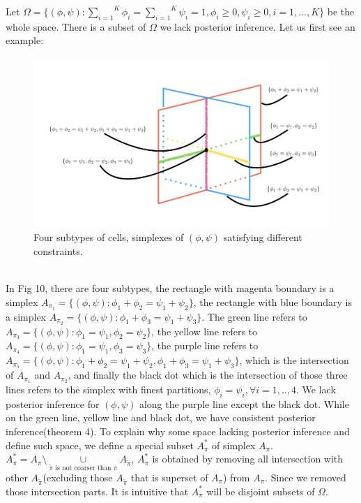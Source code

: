 \documentclass[aoas,preprint]{imsart}
\begin{document}
Let $\Omega = \{(\phi, \psi): \overset{K}{\underset{i = 1}\sum}\phi_i = \overset{K}{\underset{i = 1}\sum}\psi_i = 1, \phi_i \geq 0, \psi_i \geq 0 , i = 1,..., K\}$ be the whole space. There is a subset of $\Omega$ we lack posterior inference. Let us first see an example:
\begin{figure}[h]
\includegraphics[scale = 0.5]{Figs/overlap.png}
 \caption{Four subtypes of cells,  simplexes of $(\phi,\psi)$ satisfying different constraints.}
  \label{fig:1}
\end{figure}
\hfill\\
In Fig 10, there are four subtypes, the rectangle with magenta boundary is a simplex $A_{\pi_1} = \{(\phi,\psi) : \phi_1 + \phi_2 = \psi_1 + \psi_2\}$, the rectangle with blue boundary is a simplex $A_{\pi_2} = \{(\phi,\psi) : \phi_1 + \phi_3 = \psi_1 + \psi_3\}$. The green line refers to $A_{\pi_3} = \{(\phi,\psi) : \phi_1 = \psi_1, \phi_2 = \psi_2\}$, the yellow line refers to $A_{\pi_4} = \{(\phi,\psi) : \phi_1 = \psi_1, \phi_3 = \psi_3\}$, the purple line refers to $A_{\pi_5} = \{(\phi,\psi) : \phi_1 + \phi_2 = \psi_1 + \psi_2, \phi_1 + \phi_3 = \psi_1 + \psi_3\}$, which is the intersection of $A_{\pi_1}$ and $A_{\pi_2}$, and finally the black dot which is the intersection of those three lines refers to the simplex with finest partitions, $\phi_i = \psi_i, \forall i = 1,..,4$. We lack posterior inference for $(\phi,\psi)$ along the purple line except the black dot. While on the green line, yellow line and black dot, we have consistent posterior inference(theorem 4). To explain why some space lacking posterior inference and define such space, we define a special subset $A_\pi^*$ of simplex $A_\pi$. $A_\pi^* = A_\pi\setminus \underset{\tilde{\pi} \text{ is not coarser than } \pi }\cup A_{\tilde{\pi}}$, $A_\pi^*$ is obtained by removing all intersection with other $A_{\tilde{\pi}}$(excluding those $A_{\tilde{\pi}}$ that is superset of $A_\pi$) from $A_\pi$. Since we removed those intersection parts. It is intuitive that $A_\pi^*$ will be disjoint subsets of $\Omega$.\\
\end{document}
